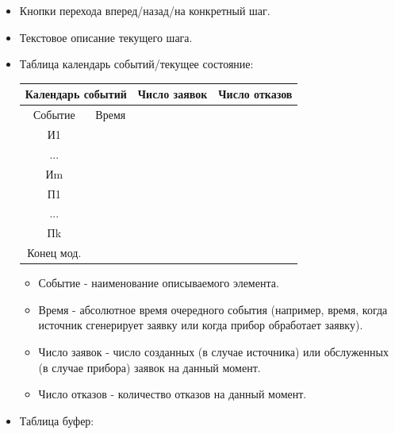 \documentclass[a4paper, 14pt]{article}
\begin{document}
\begin{itemize}
	\item Кнопки перехода вперед/назад/на конкретный шаг.
	\item Текстовое описание текущего шага.
	\item Таблица календарь событий/текущее состояние:
	      \begin{center}
		      \begin{tabular}{|c|c|c|c|}
			      \hline
			      \multicolumn{2}{|c|}{Календарь событий} & Число заявок & Число отказов   \\
			      \hline
			      Событие                                 & Время        &               & \\
			      \hline
			      И1                                      &              &               & \\
			      \hline
			      ...                                     &              &               & \\
			      \hline
			      Иm                                      &              &               & \\
			      \hline
			      П1                                      &              &               & \\
			      \hline
			      ...                                     &              &               & \\
			      \hline
			      Пk                                      &              &               & \\
			      \hline
			      Конец мод.                              &              &               & \\
			      \hline
		      \end{tabular}
	      \end{center}
	      \begin{itemize}
		      \item Событие - наименование описываемого элемента.
		      \item Время - абсолютное время очередного события (например, время, когда источник сгенерирует заявку или когда прибор обработает заявку).
		      \item Число заявок - число созданных (в случае источника) или обслуженных (в случае прибора) заявок на данный момент.
		      \item Число отказов - количество отказов на данный момент.
	      \end{itemize}
	\item Таблица буфер:

\end{itemize}
\end{document}
